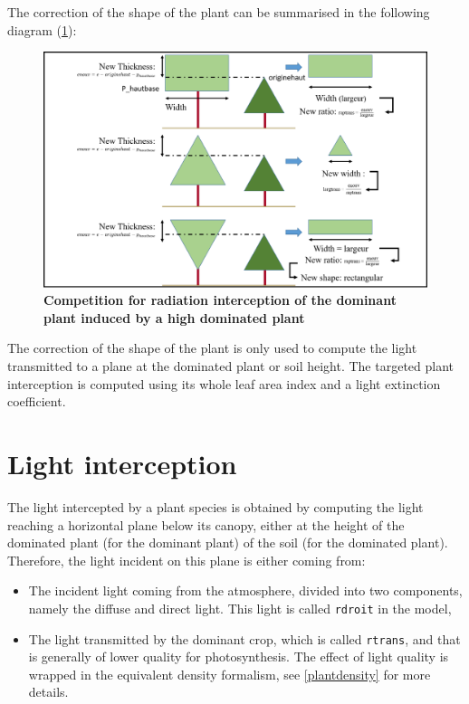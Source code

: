 \documentclass[]{book}
\providecommand{\tightlist}{%
  \setlength{\itemsep}{0pt}\setlength{\parskip}{0pt}}
\theoremstyle{definition}
\theoremstyle{definition}
\theoremstyle{definition}
\theoremstyle{remark}
\begin{document}
The correction of the shape of the plant can be summarised in the
following diagram (\ref{fig:Comprad}):

\begin{figure}
\centering
\includegraphics{img/Light-interception-dominant-2.png}
\caption{\label{fig:Comprad}\textbf{Competition for radiation interception
of the dominant plant induced by a high dominated plant}}
\end{figure}

The correction of the shape of the plant is only used to compute the
light transmitted to a plane at the dominated plant or soil height. The
targeted plant interception is computed using its whole leaf area index
and a light extinction coefficient.

\section{Light interception}\label{light-interception}

The light intercepted by a plant species is obtained by computing the
light reaching a horizontal plane below its canopy, either at the height
of the dominated plant (for the dominant plant) of the soil (for the
dominated plant). Therefore, the light incident on this plane is either
coming from:

\begin{itemize}
\tightlist
\item
  The incident light coming from the atmosphere, divided into two
  components, namely the diffuse and direct light. This light is called
  \texttt{rdroit} in the model,
\item
  The light transmitted by the dominant crop, which is called
  \texttt{rtrans}, and that is generally of lower quality for
  photosynthesis. The effect of light quality is wrapped in the
  equivalent density formalism, see \ref{plantdensity} for more details.
\end{itemize}
\end{document}
